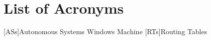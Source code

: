 
\chapter*{List of Acronyms} 

\begin{acronym}
\singlespace

[ASs]{Autonomous Systems}
 Windows Machine
[RTs]{Routing Tables}

\end{acronym}